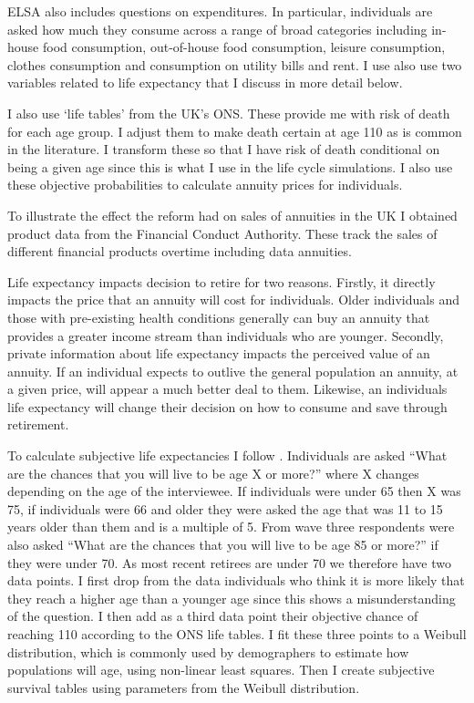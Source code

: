 \documentclass[12pt]{article}
\begin{document}
ELSA also includes questions on expenditures. In particular, individuals are asked how much they consume across a range of broad
categories including in-house food consumption, out-of-house food consumption, leisure consumption, clothes consumption and
consumption on utility bills and rent. I use also use two variables related to life expectancy that I discuss in more detail below.

I also use `life tables' from the UK's ONS. These provide me with risk of death for each age group. I adjust them
to make death certain at age 110 as is common in the literature. I transform these so that I have risk of death conditional on being
a given age since this is what I use in the life cycle simulations. I also use these objective probabilities to
calculate annuity prices for individuals.

To illustrate the effect the reform had on sales of annuities in the UK I obtained product data from the Financial Conduct Authority.
These track the sales of different financial products overtime including data annuities.

Life expectancy impacts decision to retire for two reasons. Firstly, it directly impacts the price that an annuity will cost for
individuals. Older individuals and those with pre-existing health conditions generally can buy an annuity that provides a greater
income stream than individuals who are younger. Secondly, private information about life expectancy impacts the perceived
value of an annuity. If an individual expects to outlive the general population an annuity, at a given price, will appear
a much better deal to them. Likewise, an individuals life expectancy will change their decision on how to consume and save
through retirement.

To calculate subjective life expectancies I follow \cite{odea_sturrock_rest_2023}. Individuals are asked “What are the chances that you will
live to be age X or more?” where X changes depending on the age of the interviewee. If individuals were under 65 then X was 75, if individuals
were 66 and older they were asked the age that was 11 to 15 years older than them and is a multiple of 5. From wave three respondents were
also asked “What are the chances that you will live to be age 85 or more?” if they were under 70. As most recent retirees are under 70 we
therefore have two data points. I first drop from the data individuals who think it is more likely that they reach a higher age than a younger
age since this shows a misunderstanding of the question. I then add as a third data point their objective chance of reaching 110 according to the ONS life tables.
I fit these three points to a Weibull distribution, which is commonly used by demographers to estimate how populations
will age, using non-linear least squares. Then I create subjective survival tables using parameters from the Weibull distribution.
\end{document}
